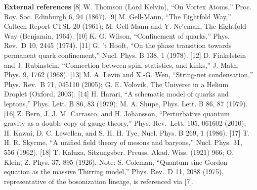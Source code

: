 \documentclass[
]{article}
\begin{document}
\textbf{External references} {[}8{]} W. Thomson (Lord Kelvin), ``On
Vortex Atoms,'' Proc. Roy. Soc. Edinburgh 6, 94 (1867). {[}9{]} M.
Gell-Mann, ``The Eightfold Way,'' Caltech Report CTSL-20 (1961); M.
Gell-Mann and Y. Ne'eman, The Eightfold Way (Benjamin, 1964). {[}10{]}
K. G. Wilson, ``Confinement of quarks,'' Phys. Rev.~D 10, 2445 (1974).
{[}11{]} G. 't Hooft, ``On the phase transition towards permanent quark
confinement,'' Nucl. Phys. B 138, 1 (1978). {[}12{]} D. Finkelstein and
J. Rubinstein, ``Connection between spin, statistics, and kinks,'' J.
Math. Phys. 9, 1762 (1968). {[}13{]} M. A. Levin and X.-G. Wen,
``String-net condensation,'' Phys. Rev.~B 71, 045110 (2005); G. E.
Volovik, The Universe in a Helium Droplet (Oxford, 2003). {[}14{]} H.
Harari, ``A schematic model of quarks and leptons,'' Phys. Lett. B 86,
83 (1979); M. A. Shupe, Phys. Lett. B 86, 87 (1979). {[}16{]} Z. Bern,
J. J. M. Carrasco, and H. Johansson, ``Perturbative quantum gravity as a
double copy of gauge theory,'' Phys. Rev.~Lett. 105, 061602 (2010); H.
Kawai, D. C. Lewellen, and S. H. H. Tye, Nucl. Phys. B 269, 1 (1986).
{[}17{]} T. H. R. Skyrme, ``A unified field theory of mesons and
baryons,'' Nucl. Phys. 31, 556 (1962). {[}18{]} T. Kaluza, Sitzungsber.
Preuss. Akad. Wiss. (1921) 966; O. Klein, Z. Phys. 37, 895 (1926). Note:
S. Coleman, ``Quantum sine-Gordon equation as the massive Thirring
model,'' Phys. Rev.~D 11, 2088 (1975), representative of the
bosonization lineage, is referenced via {[}7{]}.
\end{document}
